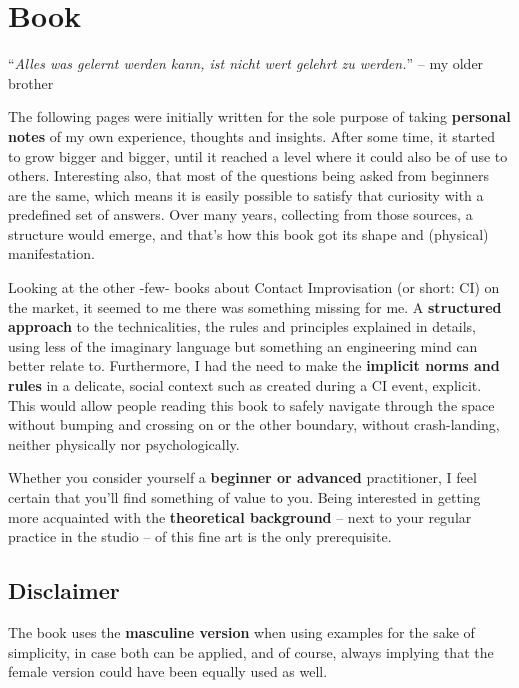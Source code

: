 \section{Book}\label{sec:book}

\begin{displayquote}
    ``\textit{Alles was gelernt werden kann, ist nicht wert gelehrt zu werden.}'' -- my older brother
\end{displayquote}

The following pages were initially written for the sole purpose of taking \textbf{personal notes} of my own experience, thoughts and insights.
After some time, it started to grow bigger and bigger, until it reached a level where it could also be of use to others.
Interesting also, that most of the questions being asked from beginners are the same, which means it is easily possible to satisfy that curiosity with a predefined set of answers.
Over many years, collecting from those sources, a structure would emerge, and that's how this book got its shape and (physical) manifestation.

Looking at the other -few- books about Contact Improvisation (or short: CI) on the market, it seemed to me there was something missing for me.
A \textbf{structured approach} to the technicalities, the rules and principles explained in details, using less of the imaginary language but something an engineering mind can better relate to.
Furthermore, I had the need to make the \textbf{implicit norms and rules} in a delicate, social context such as created during a CI event, explicit.
This would allow people reading this book to safely navigate through the space without bumping and crossing on or the other boundary, without crash-landing, neither physically nor psychologically.

Whether you consider yourself a \textbf{beginner or advanced} practitioner, I feel certain that you'll find something of value to you.
Being interested in getting more acquainted with the \textbf{theoretical background} -- next to your regular practice in the studio -- of this fine art is the only prerequisite.

\subsection{Disclaimer}\label{subsec:disclaimer}

The book uses the \textbf{masculine version} when using examples for the sake of simplicity, in case both can be applied, and of course, always implying that the female version could have been equally used as well.

